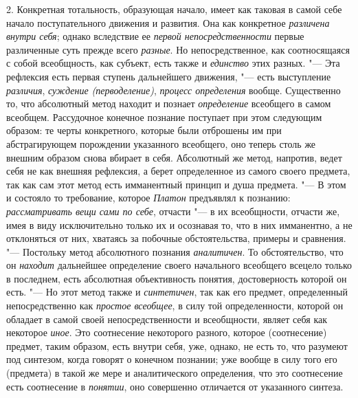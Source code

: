 {{2. Конкретная тотальность, образующая начало, имеет как
таковая в самой себе начало поступательного движения и развития. Она как
конкретное {\em различена внутри себя};
однако вследствие ее {\em первой непосредственности}
первые различенные суть прежде всего {\em разные}. Но
непосредственное, как соотносящаяся с собой всеобщность, как субъект, есть
также и {\em единство} этих разных. "--- Эта рефлексия есть первая
ступень дальнейшего движения, "--- есть выступление
{\em различия}, {\em суждение (перводеление)}, {\em процесс определения}
вообще. Существенно то, что абсолютный метод находит и
познает {\em определение}
всеобщего в самом всеобщем. Рассудочное конечное познание
поступает при этом следующим образом: те черты конкретного, которые были
отброшены им при абстрагирующем порождении указанного всеобщего, оно теперь
столь же внешним образом снова вбирает в себя. Абсолютный же метод,
напротив, ведет себя не как внешняя рефлексия, а берет определенное из
самого своего предмета, так как сам этот метод есть имманентный принцип и
душа предмета. "--- В этом и состояло то
требование, которое {\em Платон}
предъявлял к познанию:
{\em рассматривать вещи сами по себе},
отчасти "--- в их всеобщности, отчасти же, имея в
виду исключительно только их и осознавая то, что в них имманентно, а не
отклоняться от них, хватаясь за побочные обстоятельства, примеры и
сравнения. "--- Постольку метод абсолютного познания
{\em аналитичен}. То
обстоятельство, что он {\em находит}
дальнейшее определение своего начального всеобщего всецело
только в последнем, есть абсолютная объективность понятия, достоверность
которой он есть. "--- \label{bkm:bmpg224a}Но этот метод также и
{\em синтетичен}, так как
его предмет, определенный непосредственно как {\em простое всеобщее}, в
силу той определенности, которой он обладает в самой своей
непосредственности и всеобщности, являет себя как некоторое
{\em иное}. Это
соотнесение некоторого разного, которое (соотнесение) предмет, таким
образом, есть внутри себя, уже, однако, не есть то, что разумеют под
синтезом, когда говорят о конечном познании; уже вообще в силу того его
(предмета) в такой же мере и аналитического определения, что это
соотнесение есть соотнесение в {\em понятии}, оно
совершенно отличается от указанного синтеза.

}}

